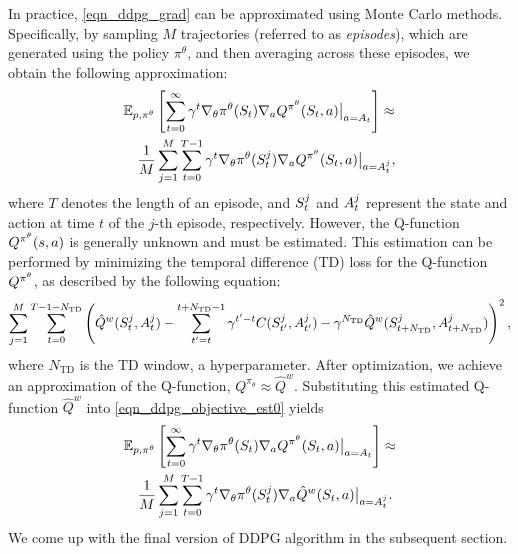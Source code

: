 \documentclass[12pt,twoside]{../../mitthesis}
\begin{document}
In practice, \eqref{eqn_ddpg_grad} can be approximated using Monte Carlo methods. Specifically, by sampling $M$ trajectories (referred to as \textit{episodes}), which are generated using the policy $\pi^{\theta}$, and then averaging across these episodes, we obtain the following approximation:
\begin{equation}
    \label{eqn_ddpg_objective_est0}
    \begin{aligned}
&\E[\transit, \policy^{\theta}]{\sum_{t=0}^{\infty}\gamma^t\nabla_{\theta}\policy^{\theta}(\State_t)\nabla_{\action} Q^{\policy^{\theta}}(\State_t, \action)\big\rvert_{\action = \Action_t}} \approx \\ 
&\quad\frac{1}{M} \sum_{j = 1}^M \sum_{t=0}^{T-1} \gamma ^ t \nabla_{\theta}\policy^{\theta}(\State_t^j)\nabla_{\action} Q^{\policy^{\theta}}(\State_t, \action)\big\rvert_{\action = \Action_t^j},
    \end{aligned}
\end{equation}
where $T$ denotes the length of an episode, and  $S_t^j$  and $A_t^j$ represent the state and action at time $t$ of the $j$-th episode, respectively.
However, the Q-function $Q^{\pi^{\theta}}(s, a)$ is generally unknown and must be estimated. This estimation can be performed by minimizing the temporal difference (TD) loss for the Q-function  $Q^{\pi^{\theta}}$, as described by the following equation:
\begin{equation}
    \label{eqn_td_loss}
    \sum_{j=1}^M\sum_{t=0}^{T-1 - N_{\text{TD}}}\left(\hat Q^w(\State_t^j, \Action_t^j) - \sum_{t'=t}^{t + N_{\text{TD}} - 1} \gamma^{t'-t}\Cost(\State_{t'}^j, \Action_{t'}^j) - \gamma^{N_{\text{TD}}}\hat Q^w(\State_{t + N_{\text{TD}}}^j, \Action_{t + N_{\text{TD}}}^j)\right)^2,
\end{equation}
where $N_{\text{TD}}$ is the TD window, a hyperparameter.
After optimization, we achieve an approximation of the Q-function, $Q^{\pi_{\theta}} \approx \hat{Q}^w$. Substituting this estimated Q-function $\hat{Q}^w$ into \eqref{eqn_ddpg_objective_est0} yields
\begin{equation}
    \label{eqn_ddpg_objective_est}
    \begin{aligned}
        &\E[\transit, \policy^{\theta}]{\sum_{t=0}^{\infty}\gamma^t\nabla_{\theta}\policy^{\theta}(\State_t)\nabla_{\action} Q^{\policy^{\theta}}(\State_t, \action)\big\rvert_{\action = \Action_t}} \approx \\ 
        &\quad\frac{1}{M} \sum_{j = 1}^M \sum_{t=0}^{T-1} \gamma ^ t \nabla_{\theta}\policy^{\theta}(\State_t^j)\nabla_{\action} \hat Q^{w}(\State_t, \action)\big\rvert_{\action = \Action_t^j}.
    \end{aligned}
\end{equation}
We come up with the final version of DDPG algorithm in the subsequent section.
\end{document}
